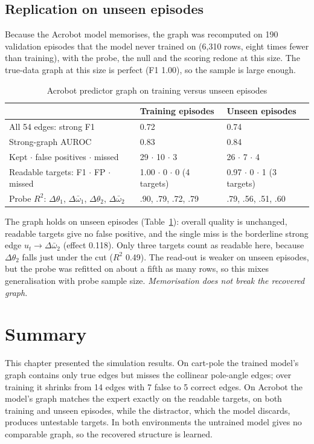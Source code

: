 \documentclass[11pt, a4paper, oneside,enumerate,textcomp]{report}
\newcommand{\wb}{\bar{\omega}}
\newcommand{\dd}{\Delta}
\newcommand{\Rsq}{R^2}
\begin{document}
\subsection{Replication on unseen episodes}

Because the Acrobot model memorises, the graph was recomputed on 190 validation episodes that the model never trained on (6,310 rows, eight times fewer than training), with the probe, the null and the scoring redone at this size. The true-data graph at this size is perfect (F1 1.00), so the sample is large enough.

\begin{table}[htbp]
\caption{Acrobot predictor graph on training versus unseen episodes}
\centering
\small
\begin{tabular}{| p{6.2cm} | p{3.4cm} | p{3.4cm} |}
\hline
 & \textbf{Training episodes} & \textbf{Unseen episodes} \\
\hline
All 54 edges: strong F1 & 0.72 & 0.74 \\
\hline
Strong-graph AUROC & 0.83 & 0.84 \\
\hline
Kept $\cdot$ false positives $\cdot$ missed & 29 $\cdot$ 10 $\cdot$ 3 & 26 $\cdot$ 7 $\cdot$ 4 \\
\hline
Readable targets: F1 $\cdot$ FP $\cdot$ missed & 1.00 $\cdot$ 0 $\cdot$ 0 (4 targets) & 0.97 $\cdot$ 0 $\cdot$ 1 (3 targets) \\
\hline
Probe $\Rsq$: $\dd\theta_1$, $\dd\wb_1$, $\dd\theta_2$, $\dd\wb_2$ & .90, .79, .72, .79 & .79, .56, .51, .60 \\
\hline
\end{tabular}
\label{tab:ac_val}
\end{table}

The graph holds on unseen episodes (Table~\ref{tab:ac_val}): overall quality is unchanged, readable targets give no false positive, and the single miss is the borderline strong edge $u_t \rightarrow \dd\wb_2$ (effect 0.118). Only three targets count as readable here, because $\dd\theta_2$ falls just under the cut ($\Rsq$ 0.49). The read-out is weaker on unseen episodes, but the probe was refitted on about a fifth as many rows, so this mixes generalisation with probe sample size. \emph{Memorisation does not break the recovered graph.}

\section{Summary}

This chapter presented the simulation results. On cart-pole the trained model's graph contains only true edges but misses the collinear pole-angle edges; over training it shrinks from 14 edges with 7 false to 5 correct edges. On Acrobot the model's graph matches the expert exactly on the readable targets, on both training and unseen episodes, while the distractor, which the model discards, produces untestable targets. In both environments the untrained model gives no comparable graph, so the recovered structure is learned.
\end{document}

